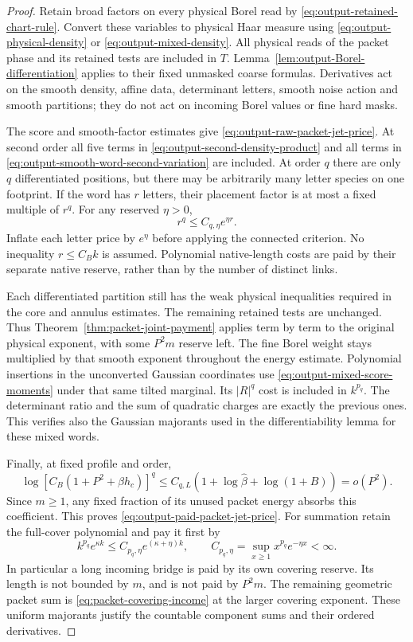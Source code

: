 \documentclass[11pt,reqno]{amsart}
\numberwithin{equation}{section}
\theoremstyle{definition}
\theoremstyle{remark}
\begin{document}
\begin{proof}
Retain broad factors on every physical Borel read by
\eqref{eq:output-retained-chart-rule}. Convert these variables
to physical Haar measure using \eqref{eq:output-physical-density}
or \eqref{eq:output-mixed-density}. All physical reads of the
packet phase and its retained tests are included in \(T\).
Lemma~\ref{lem:output-Borel-differentiation} applies to their
fixed unmasked coarse formulas. Derivatives act on the smooth
density, affine data, determinant letters, smooth noise action
and smooth partitions; they do not act on incoming Borel
values or fine hard masks.

The score and smooth-factor estimates give
\eqref{eq:output-raw-packet-jet-price}. At second order all
five terms in \eqref{eq:output-second-density-product} and
all terms in \eqref{eq:output-smooth-word-second-variation}
are included. At order \(q\) there are only \(q\)
differentiated positions, but there may be arbitrarily many
letter species on one footprint. If the word has \(r\)
letters, their placement factor is at most a fixed multiple
of \(r^q\). For any reserved \(\eta>0\),
\[
                r^q\le C_{q,\eta}e^{\eta r}.
\]
Inflate each letter price by \(e^\eta\) before applying the
connected criterion. No inequality \(r\le C_Bk\) is assumed.
Polynomial native-length costs are paid by their separate
native reserve, rather than by the number of distinct links.

Each differentiated partition still has the weak physical
inequalities required in the core and annulus estimates.
The remaining retained tests are unchanged. Thus
Theorem~\ref{thm:packet-joint-payment} applies term by term to
the original physical exponent, with some \(P^2m\) reserve
left. The fine Borel weight stays multiplied by that smooth
exponent throughout the energy estimate. Polynomial insertions
in the unconverted Gaussian
coordinates use \eqref{eq:output-mixed-score-moments} under
that same tilted marginal. Its \(|R|^q\) cost is included
in \(k^{p_q}\). The determinant ratio and the sum of quadratic
charges are exactly the previous ones. This verifies also
the Gaussian majorants used in the differentiability lemma
for these mixed words.

Finally, at fixed profile and order,
\[
 \log[C_B(1+P^2+\beta h_c)]^q
                \le C_{q,L}(1+\log\widehat\beta+\log(1+B))
                                                        =o(P^2).
\]
Since \(m\ge1\), any fixed fraction of its unused packet
energy absorbs this coefficient. This proves
\eqref{eq:output-paid-packet-jet-price}.
For summation retain the full-cover polynomial and pay it
first by
\[
 k^{p_q}e^{\kappa k}
              \le C_{p_q,\eta}e^{(\kappa+\eta)k},\qquad
 C_{p_q,\eta}=\sup_{x\ge1}x^{p_q}e^{-\eta x}<\infty.
\]
In particular a long incoming bridge is paid by its own
covering reserve. Its length is not bounded by \(m\), and
is not paid by \(P^2m\). The remaining geometric packet
sum is \eqref{eq:packet-covering-income} at the larger
covering exponent. These uniform majorants justify the
countable component sums and their ordered derivatives.
\end{proof}
\end{document}
